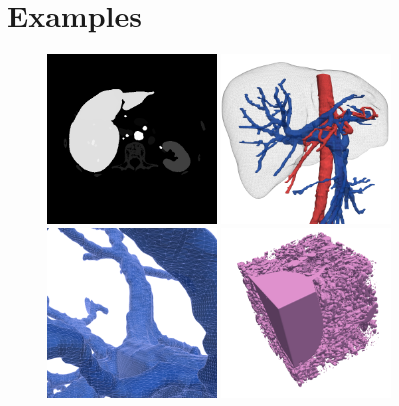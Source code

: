 
\section{Examples}\label{sec:examples}

\begin{figure}
\centering
\includegraphics[width=0.40\textwidth]{src/figs/ircad01_segmentation_65.png}
\includegraphics[width=0.40\textwidth]{src/figs/ircad01_liver_tricolore_01.png}
\includegraphics[width=0.40\textwidth]{src/figs/ircad01_porta_blue_01.png}
\includegraphics[width=0.40\textwidth]{src/figs/nrn10_200_pink_02.png}

\end{figure}
